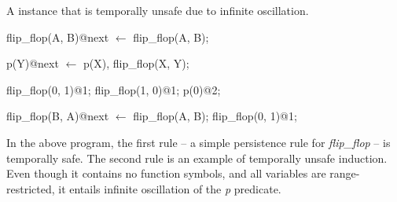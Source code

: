 \begin{example} 
%
A \slang instance that is temporally unsafe due to infinite oscillation.

\begin{Dedalus}
flip\_flop(A, B)@next \(\leftarrow\) flip\_flop(A, B);

p(Y)@next \(\leftarrow\) p(X), flip\_flop(X, Y);

flip\_flop(0, 1)@1;
flip\_flop(1, 0)@1;
p(0)@2;
\end{Dedalus}


\begin{Dedalus}
flip\_flop(B, A)@next \(\leftarrow\) flip\_flop(A, B);
flip\_flop(0, 1)@1;
\end{Dedalus}

In the above program, the first rule -- a simple persistence rule for
\emph{flip\_flop} -- is temporally safe.  The second rule is an example of
temporally unsafe induction.  Even though it contains no function symbols, and
all variables are range-restricted, it entails infinite oscillation of the
\emph{p} predicate.  
\end{example}





